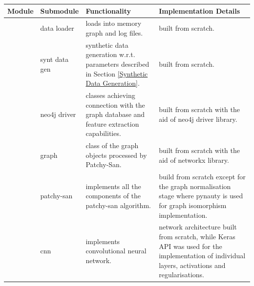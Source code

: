 \begin{longtable}{|p{}||p{}|p{}|p{}|}
  \hline
  \textbf{Module} & \textbf{Submodule} & \textbf{Functionality}                                                                                          & \textbf{Implementation Details}                                                                                                                \\
\hline
\noalign{\vspace{6pt}}
\hline

 \multirow{4}{*}{(1)}             & data loader        & loads into memory graph and log files.                                                                          & built from scratch.                                                                                                                             \\
\cline{2-4}
                  & synt data gen      & synthetic data generation w.r.t. parameters described in Section \ref{Synthetic Data Generation}.                & built from scratch.                                                                                                                            \\
\cline{2-4}
                  & neo4j driver       & classes achieving connection with the graph database and feature extraction capabilities.                        & built from scratch with the aid of neo4j driver library.                                                                                        \\
\cline{2-4}
                 & graph              & class of the graph objects processed by Patchy-San.                                                              & built from scratch with the aid of networkx library.                                                                                            \\
 \hline
\noalign{\vspace{6pt}}
\hline


 \multirow{6}{*}{(2)}              & patchy-san         & implements all the components of the patchy-san algorithm.                                                       & build from scratch except for the graph normalisation stage where pynauty is used for graph isomorphism implementation.                         \\
\cline{2-4}
                  & cnn                & implements convolutional neural network.                                                                         & network architecture built from scratch, while Keras API was used for the implementation of individual layers, activations and regularisations. \\
                \cline{2-4}


\end{longtable}
